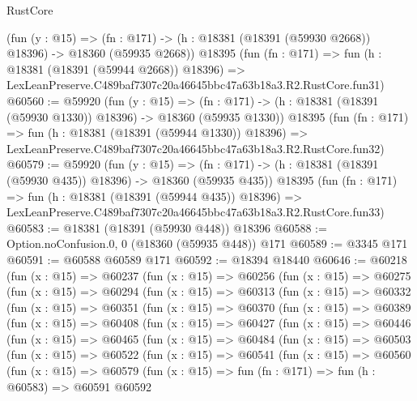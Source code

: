 \begin{lexlean}{RustCore}
\begin{coremodule}
    (fun (y : @15) =>
    (fn : @171) -> (h : @18381 (@18391 (@59930 @2668)) @18396) -> @18360 (@59935 @2668))
    @18395
    (fun (fn : @171) =>
    fun (h : @18381 (@18391 (@59944 @2668)) @18396) =>
    LexLeanPreserve.C489baf7307c20a46645bbc47a63b18a3.R2.RustCore.fun31)
@60560 := @59920
    (fun (y : @15) =>
    (fn : @171) -> (h : @18381 (@18391 (@59930 @1330)) @18396) -> @18360 (@59935 @1330))
    @18395
    (fun (fn : @171) =>
    fun (h : @18381 (@18391 (@59944 @1330)) @18396) =>
    LexLeanPreserve.C489baf7307c20a46645bbc47a63b18a3.R2.RustCore.fun32)
@60579 := @59920
    (fun (y : @15) =>
    (fn : @171) -> (h : @18381 (@18391 (@59930 @435)) @18396) -> @18360 (@59935 @435))
    @18395
    (fun (fn : @171) =>
    fun (h : @18381 (@18391 (@59944 @435)) @18396) =>
    LexLeanPreserve.C489baf7307c20a46645bbc47a63b18a3.R2.RustCore.fun33)
@60583 := @18381 (@18391 (@59930 @448)) @18396
@60588 := Option.noConfusion.{0, 0} (@18360 (@59935 @448)) @171
@60589 := @3345 @171
@60591 := @60588 @60589 @171
@60592 := @18394 @18440
@60646 := @60218
    (fun (x : @15) =>
    @60237
      (fun (x : @15) =>
      @60256
        (fun (x : @15) =>
        @60275
          (fun (x : @15) =>
          @60294
            (fun (x : @15) =>
            @60313
              (fun (x : @15) =>
              @60332
                (fun (x : @15) =>
                @60351
                  (fun (x : @15) =>
                  @60370
                    (fun (x : @15) =>
                    @60389
                      (fun (x : @15) =>
                      @60408
                        (fun (x : @15) =>
                        @60427
                          (fun (x : @15) =>
                          @60446
                            (fun (x : @15) =>
                            @60465
                              (fun (x : @15) =>
                              @60484
                                (fun (x : @15) =>
                                @60503
                                  (fun (x : @15) =>
                                  @60522
                                    (fun (x : @15) =>
                                    @60541
                                      (fun (x : @15) =>
                                      @60560
                                        (fun (x : @15) =>
                                        @60579
                                          (fun (x : @15) =>
                                          fun (fn : @171) =>
                                          fun (h : @60583) =>
                                          @60591
                                            @60592

\end{coremodule}
\end{lexlean}
